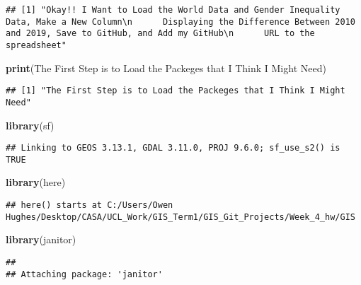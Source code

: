 \documentclass[
]{article}
\newenvironment{Shaded}{\begin{snugshade}}{\end{snugshade}}
\newcommand{\FunctionTok}[1]{\textcolor[rgb]{0.13,0.29,0.53}{\textbf{#1}}}
\newcommand{\NormalTok}[1]{#1}
\newcommand{\StringTok}[1]{\textcolor[rgb]{0.31,0.60,0.02}{#1}}
\begin{document}
\begin{verbatim}
## [1] "Okay!! I Want to Load the World Data and Gender Inequality Data, Make a New Column\n      Displaying the Difference Between 2010 and 2019, Save to GitHub, and Add my GitHub\n      URL to the spreadsheet"
\end{verbatim}

\begin{Shaded}
\begin{Highlighting}[]
\FunctionTok{print}\NormalTok{(}\StringTok{\textquotesingle{}The First Step is to Load the Packeges that I Think I Might Need\textquotesingle{}}\NormalTok{)}
\end{Highlighting}
\end{Shaded}

\begin{verbatim}
## [1] "The First Step is to Load the Packeges that I Think I Might Need"
\end{verbatim}

\begin{Shaded}
\begin{Highlighting}[]
\FunctionTok{library}\NormalTok{(sf)}
\end{Highlighting}
\end{Shaded}

\begin{verbatim}
## Linking to GEOS 3.13.1, GDAL 3.11.0, PROJ 9.6.0; sf_use_s2() is TRUE
\end{verbatim}

\begin{Shaded}
\begin{Highlighting}[]
\FunctionTok{library}\NormalTok{(here)}
\end{Highlighting}
\end{Shaded}

\begin{verbatim}
## here() starts at C:/Users/Owen Hughes/Desktop/CASA/UCL_Work/GIS_Term1/GIS_Git_Projects/Week_4_hw/GIS
\end{verbatim}

\begin{Shaded}
\begin{Highlighting}[]
\FunctionTok{library}\NormalTok{(janitor)}
\end{Highlighting}
\end{Shaded}

\begin{verbatim}
## 
## Attaching package: 'janitor'
\end{verbatim}
\end{document}
